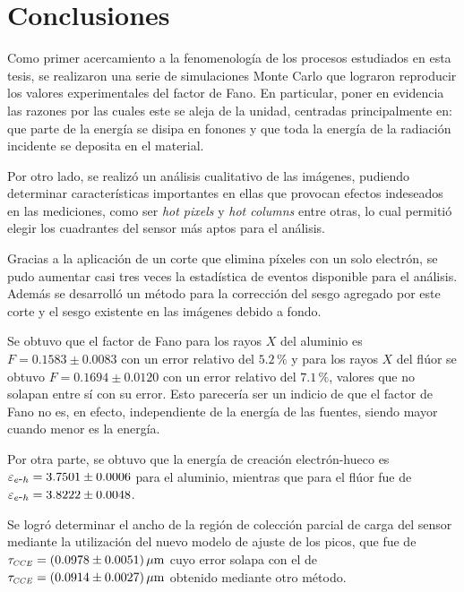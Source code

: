 \chapter{Conclusiones}
\noindent Como primer acercamiento a la fenomenología de los procesos estudiados en esta tesis, se realizaron una serie de simulaciones Monte Carlo que lograron reproducir los valores experimentales del factor de Fano. En particular, poner en evidencia las razones por las cuales este se aleja de la unidad, centradas principalmente en: que parte de la energía se disipa en fonones y que toda la energía de la radiación incidente se deposita en el material.

Por otro lado, se realizó un análisis cualitativo de las imágenes, pudiendo determinar características importantes en ellas que provocan efectos indeseados en las mediciones, como ser \textit{hot pixels} y \textit{hot columns} entre otras, lo cual permitió elegir los cuadrantes del sensor más aptos para el análisis.

Gracias a la aplicación de un corte que elimina píxeles con un solo electrón, se pudo aumentar casi tres veces la estadística de eventos disponible para el análisis. Además se desarrolló un método para la corrección del sesgo agregado por este corte y el sesgo existente en las imágenes debido a fondo. 



Se obtuvo que el factor de Fano para los rayos $X$ del aluminio es $F = 0.1583 \pm 0.0083 $ con un error relativo del $5.2\,\%$ y para los rayos $X$ del flúor se obtuvo $F = 0.1694 \pm 0.0120$ con un error relativo del $7.1\,\%$, valores que no solapan entre sí con su error. Esto parecería ser un indicio de que el factor de Fano no es, en efecto, independiente de la energía de las fuentes, siendo mayor cuando menor es la energía.

Por otra parte, se obtuvo que la energía de creación electrón-hueco es $\varepsilon_{e\mbox{-}h}=3.7501\pm0.0006$ para el aluminio, mientras que para el flúor fue de $\varepsilon_{e\mbox{-}h}=3.8222\pm0.0048$.

Se logró determinar el ancho de la región de colección parcial de carga del sensor mediante la utilización del nuevo modelo de ajuste de los picos, que fue de $\tau_{\scaleto{CCE}{4pt}}=(0.0978 \pm 0.0051)\,\si{\mu m}$ cuyo error solapa con el de $\tau_{\scaleto{CCE}{4pt}}=(0.0914 \pm 0.0027)\,\si{\mu m} $ obtenido mediante otro método\cite{PCC-CCE}.

